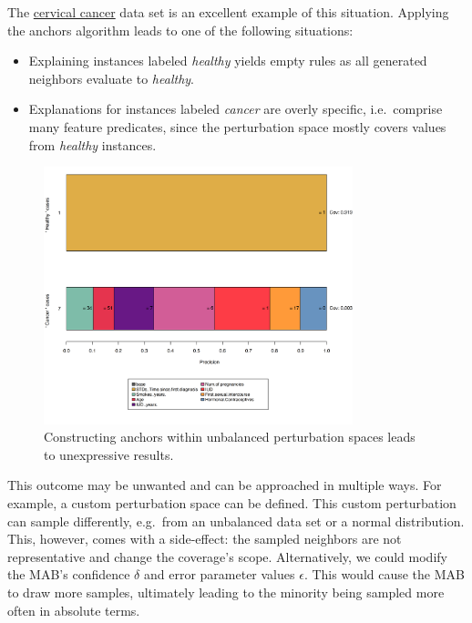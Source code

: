 \documentclass[
  10pt,
]{scrbook}
\providecommand{\tightlist}{%
  \setlength{\itemsep}{0pt}\setlength{\parskip}{0pt}}
\begin{document}
The \protect\hyperlink{cervical}{cervical cancer} data set is an excellent example of this situation.
Applying the anchors algorithm leads to one of the following situations:

\begin{itemize}
\tightlist
\item
  Explaining instances labeled \emph{healthy} yields empty rules as all generated neighbors evaluate to \emph{healthy}.
\item
  Explanations for instances labeled \emph{cancer} are overly specific, i.e.~comprise many feature predicates, since the perturbation space mostly covers values from \emph{healthy} instances.
\end{itemize}

\begin{figure}

{\centering \includegraphics[width=0.8\textwidth]{images/unnamed-chunk-37-1} 

}

\caption{Constructing anchors within unbalanced perturbation spaces leads to unexpressive results.}\label{fig:unnamed-chunk-37}
\end{figure}

This outcome may be unwanted and can be approached in multiple ways. For example, a custom perturbation space can be defined.
This custom perturbation can sample differently, e.g.~from an unbalanced data set or a normal distribution.
This, however, comes with a side-effect: the sampled neighbors are not representative and change the coverage's scope. Alternatively, we could modify the MAB's confidence \(\delta\) and error parameter values \(\epsilon\). This would cause the MAB to draw more samples, ultimately leading to the minority being sampled more often in absolute terms.
\end{document}
